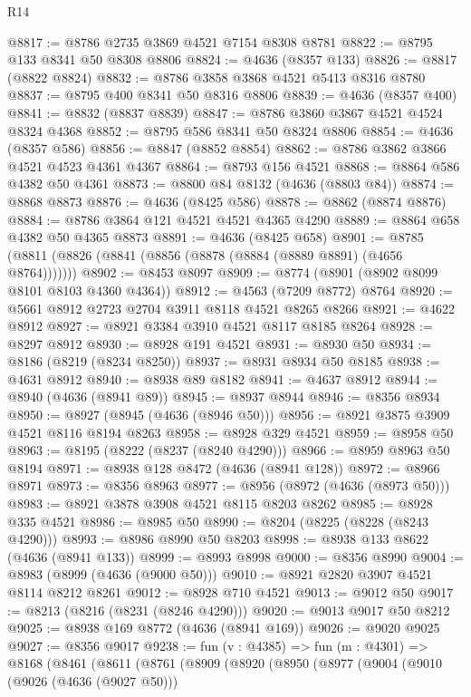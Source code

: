 \begin{lexlean}{R14}
\begin{coremodule}
@8817 := @8786 @2735 @3869 @4521 @7154 @8308 @8781
@8822 := @8795 @133 @8341 @50 @8308 @8806
@8824 := @4636 (@8357 @133)
@8826 := @8817 (@8822 @8824)
@8832 := @8786 @3858 @3868 @4521 @5413 @8316 @8780
@8837 := @8795 @400 @8341 @50 @8316 @8806
@8839 := @4636 (@8357 @400)
@8841 := @8832 (@8837 @8839)
@8847 := @8786 @3860 @3867 @4521 @4524 @8324 @4368
@8852 := @8795 @586 @8341 @50 @8324 @8806
@8854 := @4636 (@8357 @586)
@8856 := @8847 (@8852 @8854)
@8862 := @8786 @3862 @3866 @4521 @4523 @4361 @4367
@8864 := @8793 @156 @4521
@8868 := @8864 @586 @4382 @50 @4361
@8873 := @8800 @84 @8132 (@4636 (@8803 @84))
@8874 := @8868 @8873
@8876 := @4636 (@8425 @586)
@8878 := @8862 (@8874 @8876)
@8884 := @8786 @3864 @121 @4521 @4521 @4365 @4290
@8889 := @8864 @658 @4382 @50 @4365 @8873
@8891 := @4636 (@8425 @658)
@8901 := @8785 (@8811 (@8826 (@8841 (@8856 (@8878 (@8884 (@8889 @8891) (@4656 @8764)))))))
@8902 := @8453 @8097
@8909 := @8774 (@8901 (@8902 @8099 @8101 @8103 @4360 @4364))
@8912 := @4563 (@7209 @8772) @8764
@8920 := @5661 @8912 @2723 @2704 @3911 @8118 @4521 @8265 @8266
@8921 := @4622 @8912
@8927 := @8921 @3384 @3910 @4521 @8117 @8185 @8264
@8928 := @8297 @8912
@8930 := @8928 @191 @4521
@8931 := @8930 @50
@8934 := @8186 (@8219 (@8234 @8250))
@8937 := @8931 @8934 @50 @8185
@8938 := @4631 @8912
@8940 := @8938 @89 @8182
@8941 := @4637 @8912
@8944 := @8940 (@4636 (@8941 @89))
@8945 := @8937 @8944
@8946 := @8356 @8934
@8950 := @8927 (@8945 (@4636 (@8946 @50)))
@8956 := @8921 @3875 @3909 @4521 @8116 @8194 @8263
@8958 := @8928 @329 @4521
@8959 := @8958 @50
@8963 := @8195 (@8222 (@8237 (@8240 @4290)))
@8966 := @8959 @8963 @50 @8194
@8971 := @8938 @128 @8472 (@4636 (@8941 @128))
@8972 := @8966 @8971
@8973 := @8356 @8963
@8977 := @8956 (@8972 (@4636 (@8973 @50)))
@8983 := @8921 @3878 @3908 @4521 @8115 @8203 @8262
@8985 := @8928 @335 @4521
@8986 := @8985 @50
@8990 := @8204 (@8225 (@8228 (@8243 @4290)))
@8993 := @8986 @8990 @50 @8203
@8998 := @8938 @133 @8622 (@4636 (@8941 @133))
@8999 := @8993 @8998
@9000 := @8356 @8990
@9004 := @8983 (@8999 (@4636 (@9000 @50)))
@9010 := @8921 @2820 @3907 @4521 @8114 @8212 @8261
@9012 := @8928 @710 @4521
@9013 := @9012 @50
@9017 := @8213 (@8216 (@8231 (@8246 @4290)))
@9020 := @9013 @9017 @50 @8212
@9025 := @8938 @169 @8772 (@4636 (@8941 @169))
@9026 := @9020 @9025
@9027 := @8356 @9017
@9238 := fun (v : @4385) =>
  fun (m : @4301) =>
  @8168
    (@8461
      (@8611
        (@8761
          (@8909
            (@8920
              (@8950
                (@8977
                  (@9004
                    (@9010
                      (@9026 (@4636 (@9027 @50)))

\end{coremodule}
\end{lexlean}
